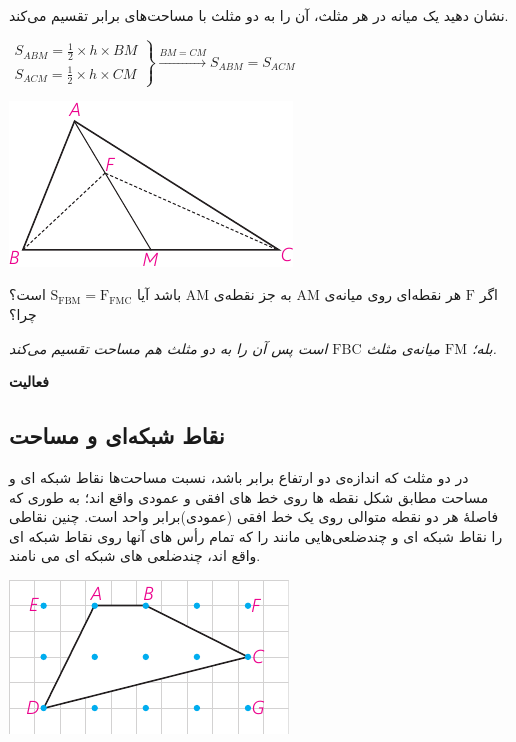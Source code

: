 \documentclass[12pt, a4paper]{book}
\begin{document}
 \begin{minipage}{0.65\textwidth}
 	نشان دهید یک میانه در هر مثلث، آن را به دو مثلث با مساحت‌های برابر تقسیم می‌کند.
 	\begin{flushleft}
 		$\left.
 		\begin{array}{ccc}
 			S_{ABM} = \frac12 \times h \times BM \\
 			S_{ACM} = \frac12 \times h \times CM
 		\end{array}
 		\right\}
 		\xrightarrow{BM = CM} S_{ABM} = S_{ACM}
 		$
 	\end{flushleft}
 \end{minipage}
 \begin{minipage}{0.3\textwidth}
 	\begin{flushleft}
 		\includegraphics{"Shapes/Fasl - 3/Dars 2/P66-S1"}
 	\end{flushleft}
 \end{minipage}

اگر $\mathrm{F}$ هر نقطه‌ای روی میانه‌ی $\mathrm{AM}$ به جز نقطه‌ی $\mathrm{AM}$ باشد آیا $\mathrm{S_{FBM} = F_{FMC}}$ است؟ چرا؟

\textit{بله؛ 
	$\mathrm{FM}$
	میانه‌ی مثلث 
	$\mathrm{FBC}$
	است پس آن را به دو مثلث هم مساحت تقسیم می‌کند.}

\textbf{فعالیت}



\subsection{نقاط شبکه‌ای و مساحت}

	  \begin{minipage}{0.7\textwidth}
در دو مثلث که اندازه‌ی دو ارتفاع برابر باشد، نسبت مساحت‌ها
نقاط شبکه ای و مساحت مطابق شکل نقطه ها روی خط های افقی و عمودی واقع اند؛ به طوری که فاصلهٔ هر دو نقطه متوالی روی یک خط افقی (عمودی)برابر واحد است. چنین نقاطی را نقاط شبکه ای و چندضلعی‌هایی مانند
را که تمام رأس های آنها روی نقاط شبکه ای واقع اند، چندضلعی های شبکه ای می نامند.
\end{minipage}   
\begin{minipage}{.3\textwidth}
	\begin{flushleft}
		\includegraphics{"Shapes/Fasl - 3/Dars 2/P69-S1.pdf"}
	\end{flushleft}
\end{minipage}
\end{document}
